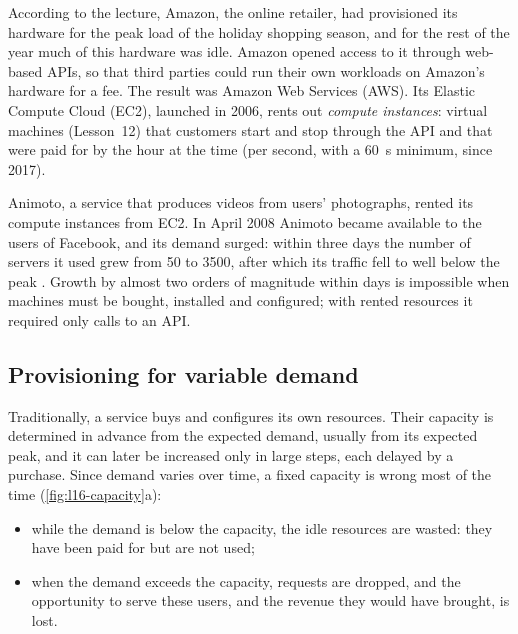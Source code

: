 \documentclass[../main.tex]{subfiles}
\begin{document}
According to the lecture, Amazon, the online retailer, had provisioned its hardware for the peak load
of the holiday shopping season, and for the rest of the year much of this
hardware was idle.  Amazon
opened access to it through web-based APIs, so that third parties could run
their own workloads on Amazon's hardware for a fee.  The result was Amazon
Web Services (AWS).  Its Elastic Compute Cloud (EC2), launched in 2006, rents
out \emph{compute instances}: virtual machines (Lesson~12) that customers
start and stop through the API and that were paid for by the hour at the
time (per second, with a \SI{60}{\second} minimum, since 2017).

Animoto, a service that produces videos from users' photographs, rented its
compute instances from EC2.  In April 2008 Animoto became available to the
users of Facebook, and its demand surged: within three days the number of
servers it used grew from 50 to 3500, after which its traffic fell to well
below the peak \cite{armbrust2009}.  Growth by almost two orders of magnitude
within days is impossible when machines must be bought, installed and
configured; with rented resources it required only calls to an
API.

\subsection{Provisioning for variable demand}

Traditionally, a service buys and configures its own resources.  Their
capacity is determined in advance from the expected demand, usually from its
expected peak, and it can later be increased only in large steps, each
delayed by a purchase.  Since demand varies over time, a fixed capacity is
wrong most of the time (\cref{fig:l16-capacity}a):
\begin{itemize}
  \item while the demand is below the capacity, the idle resources are
    wasted: they have been paid for but are not used;
  \item when the demand exceeds the capacity, requests are dropped, and the
    opportunity to serve these users, and the revenue they would have
    brought, is lost.
\end{itemize}
\end{document}
